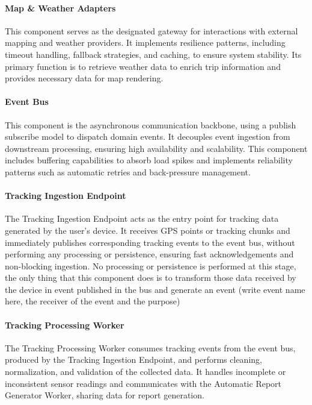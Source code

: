 \paragraph{Map \& Weather Adapters}
This component serves as the designated gateway for interactions with external mapping and weather providers. It implements resilience patterns, including timeout handling, fallback strategies, and caching, to ensure system stability. Its primary function is to retrieve weather data to enrich trip information and provides necessary data for map rendering.

\paragraph{Event Bus}
This component is the asynchronous communication backbone, using a publish subscribe model to dispatch domain events. It decouples event ingestion from downstream processing, ensuring high availability and scalability. This component includes buffering capabilities to absorb load spikes and implements reliability patterns such as automatic retries and back-pressure management.

\paragraph{Tracking Ingestion Endpoint}
The Tracking Ingestion Endpoint acts as the entry point for tracking data generated by the user’s device. It receives GPS points or tracking chunks and immediately publishes corresponding tracking events to the event bus, without performing any processing or persistence, ensuring fast acknowledgements and non-blocking ingestion. No processing or persistence is performed at this stage, the only thing that this component does is to transform those data received by the device in event published in the bus and generate an event (write event name here, the receiver of the event and the purpose)

\paragraph{Tracking Processing Worker}
The Tracking Processing Worker consumes tracking events from the event bus, produced by the Tracking Ingestion Endpoint, and performs cleaning, normalization, and validation of the collected data. It handles incomplete or inconsistent sensor readings and communicates with the Automatic Report Generator Worker, sharing data for report generation.


